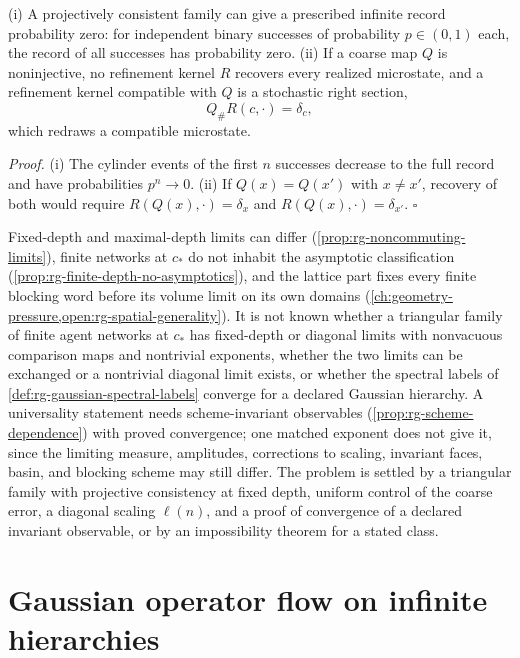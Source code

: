 (i) A projectively consistent family can give a prescribed infinite record
probability zero: for independent binary successes of probability
\(p\in(0,1)\) each, the record of all successes has probability zero. (ii) If
a coarse map \(Q\) is noninjective, no refinement kernel \(R\) recovers every
realized microstate, and a refinement kernel compatible with \(Q\) is a
stochastic right section,
\begin{equation}
Q_\#R(c,\cdot)=\delta_c,
\label{eq:rg-stochastic-right-section}
\end{equation}
which redraws a compatible microstate. 

\noindent\emph{Proof.}
(i) The cylinder events of the first \(n\) successes decrease to the full
record and have probabilities \(p^n\to0\). (ii) If \(Q(x)=Q(x')\) with
\(x\neq x'\), recovery of both would require
\(R(Q(x),\cdot)=\delta_x\) and \(R(Q(x),\cdot)=\delta_{x'}\). \(\square\)

Fixed-depth and maximal-depth limits can differ
(\cref{prop:rg-noncommuting-limits}), finite networks at \(c_*\) do not inhabit
the asymptotic classification (\cref{prop:rg-finite-depth-no-asymptotics}),
and the lattice part fixes every finite blocking word before its volume limit
on its own domains (\cref{ch:geometry-pressure,open:rg-spatial-generality}). It
is not known whether a triangular family of finite agent networks at \(c_*\)
has fixed-depth or diagonal limits with nonvacuous comparison maps and
nontrivial exponents, whether the two limits can be exchanged or a nontrivial
diagonal limit exists, or whether the spectral labels of
\cref{def:rg-gaussian-spectral-labels} converge for a declared Gaussian
hierarchy. A universality statement needs scheme-invariant observables
(\cref{prop:rg-scheme-dependence}) with proved convergence; one matched
exponent does not give it, since the limiting measure, amplitudes, corrections
to scaling, invariant faces, basin, and blocking scheme may still differ. The
problem is settled by a triangular family with projective consistency at fixed
depth, uniform control of the coarse error, a diagonal scaling \(\ell(n)\), and
a proof of convergence of a declared invariant observable, or by an
impossibility theorem for a stated class.

\section{Gaussian operator flow on infinite hierarchies}

